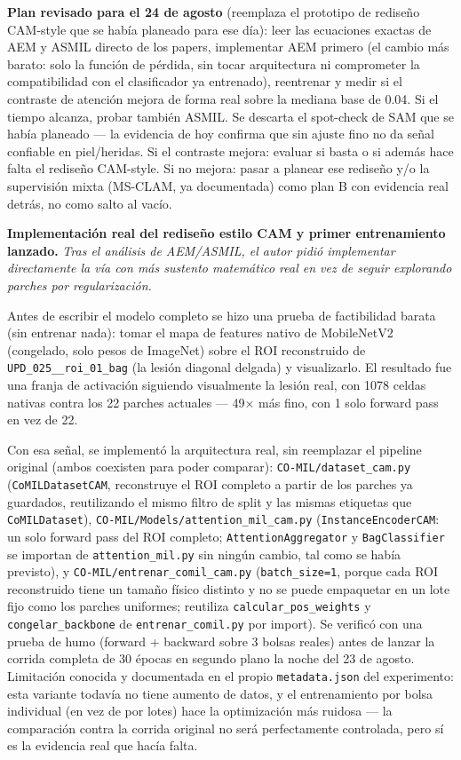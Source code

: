 \documentclass[12pt,letterpaper]{report}
\newcommand{\entrada}[2]{%
    \vspace{0.6em}
    \noindent\textbf{#1.} \textit{#2}
    \vspace{0.3em}
    \par
}
\begin{document}
\textbf{Plan revisado para el 24 de agosto} (reemplaza el prototipo de rediseño CAM-style que se
había planeado para ese día): leer las ecuaciones exactas de AEM y ASMIL directo de los papers,
implementar AEM primero (el cambio más barato: solo la función de pérdida, sin tocar arquitectura ni
comprometer la compatibilidad con el clasificador ya entrenado), reentrenar y medir si el contraste
de atención mejora de forma real sobre la mediana base de 0.04. Si el tiempo alcanza, probar también
ASMIL. Se descarta el spot-check de SAM que se había planeado --- la evidencia de hoy confirma que sin
ajuste fino no da señal confiable en piel/heridas. Si el contraste mejora: evaluar si basta o si
además hace falta el rediseño CAM-style. Si no mejora: pasar a planear ese rediseño y/o la
supervisión mixta (MS-CLAM, ya documentada) como plan B con evidencia real detrás, no como salto al
vacío.

\entrada{Implementación real del rediseño estilo CAM y primer entrenamiento lanzado}{Tras el
análisis de AEM/ASMIL, el autor pidió implementar directamente la vía con más sustento matemático
real en vez de seguir explorando parches por regularización.}

Antes de escribir el modelo completo se hizo una prueba de factibilidad barata (sin entrenar nada):
tomar el mapa de features nativo de MobileNetV2 (congelado, solo pesos de ImageNet) sobre el ROI
reconstruido de \texttt{UPD\_025\_\_roi\_01\_bag} (la lesión diagonal delgada) y visualizarlo. El
resultado fue una franja de activación siguiendo visualmente la lesión real, con 1078 celdas nativas
contra los 22 parches actuales --- 49$\times$ más fino, con 1 solo forward pass en vez de 22.

Con esa señal, se implementó la arquitectura real, sin reemplazar el pipeline original (ambos
coexisten para poder comparar): \texttt{CO-MIL/dataset\_cam.py} (\texttt{CoMILDatasetCAM}, reconstruye
el ROI completo a partir de los parches ya guardados, reutilizando el mismo filtro de split y las
mismas etiquetas que \texttt{CoMILDataset}), \texttt{CO-MIL/Models/attention\_mil\_cam.py}
(\texttt{InstanceEncoderCAM}: un solo forward pass del ROI completo; \texttt{AttentionAggregator} y
\texttt{BagClassifier} se importan de \texttt{attention\_mil.py} sin ningún cambio, tal como se había
previsto), y \texttt{CO-MIL/entrenar\_comil\_cam.py} (\texttt{batch\_size=1}, porque cada ROI
reconstruido tiene un tamaño físico distinto y no se puede empaquetar en un lote fijo como los
parches uniformes; reutiliza \texttt{calcular\_pos\_weights} y \texttt{congelar\_backbone} de
\texttt{entrenar\_comil.py} por import). Se verificó con una prueba de humo (forward + backward sobre
3 bolsas reales) antes de lanzar la corrida completa de 30 épocas en segundo plano la noche del 23 de
agosto. Limitación conocida y documentada en el propio \texttt{metadata.json} del experimento: esta
variante todavía no tiene aumento de datos, y el entrenamiento por bolsa individual (en vez de por
lotes) hace la optimización más ruidosa --- la comparación contra la corrida original no será
perfectamente controlada, pero sí es la evidencia real que hacía falta.
\end{document}
